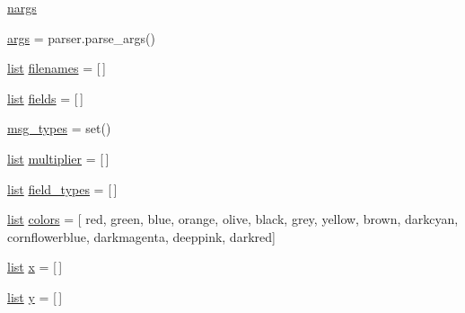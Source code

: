 \begin{DoxyCompactItemize}
\item 
\mbox{\hyperlink{namespacepymavlink_1_1tools_1_1mavgraph_a3256f7d13be9230cbcdf80fa11b884ef}{nargs}}
\item 
\mbox{\hyperlink{namespacepymavlink_1_1tools_1_1mavgraph_ae1507cb8d5fe83b0c3c74a713068bf6e}{args}} = parser.\+parse\+\_\+args()
\item 
\mbox{\hyperlink{structlist}{list}} \mbox{\hyperlink{namespacepymavlink_1_1tools_1_1mavgraph_a002b6137fc3357fe2b29eb7c3ba6d584}{filenames}} = \mbox{[}$\,$\mbox{]}
\item 
\mbox{\hyperlink{structlist}{list}} \mbox{\hyperlink{namespacepymavlink_1_1tools_1_1mavgraph_a5ba6a459d544d32a7adf561bba2386d2}{fields}} = \mbox{[}$\,$\mbox{]}
\item 
\mbox{\hyperlink{namespacepymavlink_1_1tools_1_1mavgraph_aaf7b537f295138d6406b60b6615541aa}{msg\+\_\+types}} = set()
\item 
\mbox{\hyperlink{structlist}{list}} \mbox{\hyperlink{namespacepymavlink_1_1tools_1_1mavgraph_a7c10c22d0b8a26a0f660134faa6d104a}{multiplier}} = \mbox{[}$\,$\mbox{]}
\item 
\mbox{\hyperlink{structlist}{list}} \mbox{\hyperlink{namespacepymavlink_1_1tools_1_1mavgraph_a7dd677bc790050d4a38d0a78a814fb78}{field\+\_\+types}} = \mbox{[}$\,$\mbox{]}
\item 
\mbox{\hyperlink{structlist}{list}} \mbox{\hyperlink{namespacepymavlink_1_1tools_1_1mavgraph_a19862d005460bc9f0c104743009a0ff1}{colors}} = \mbox{[} \textquotesingle{}red\textquotesingle{}, \textquotesingle{}green\textquotesingle{}, \textquotesingle{}blue\textquotesingle{}, \textquotesingle{}orange\textquotesingle{}, \textquotesingle{}olive\textquotesingle{}, \textquotesingle{}black\textquotesingle{}, \textquotesingle{}grey\textquotesingle{}, \textquotesingle{}yellow\textquotesingle{}, \textquotesingle{}brown\textquotesingle{}, \textquotesingle{}darkcyan\textquotesingle{}, \textquotesingle{}cornflowerblue\textquotesingle{}, \textquotesingle{}darkmagenta\textquotesingle{}, \textquotesingle{}deeppink\textquotesingle{}, \textquotesingle{}darkred\textquotesingle{}\mbox{]}
\item 
\mbox{\hyperlink{structlist}{list}} \mbox{\hyperlink{namespacepymavlink_1_1tools_1_1mavgraph_a850833f299bc2444a4e9077175f357cb}{x}} = \mbox{[}$\,$\mbox{]}
\item 
\mbox{\hyperlink{structlist}{list}} \mbox{\hyperlink{namespacepymavlink_1_1tools_1_1mavgraph_a2083829da277f3d120e2db2239c5ede9}{y}} = \mbox{[}$\,$\mbox{]}
\item 

\end{DoxyCompactItemize}
